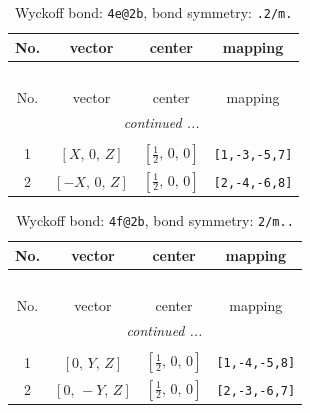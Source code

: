 \documentclass[fleqn,8pt]{jsarticle}
\begin{document}
\renewcommand{\arraystretch}{1.2}
\begin{longtable}{cccc}
\caption{Wyckoff bond: {\tt 4e@2b}, bond symmetry: {\tt .2/m.}}
 \\
 \hline \hline
No. & vector & center & mapping \\ \hline \endfirsthead

\multicolumn{3}{l}{\tablename\ \thetable{}} \\
 \hline \hline
No. & vector & center & mapping \\ \hline \endhead

 \hline \hline
\multicolumn{3}{r}{\footnotesize\it continued ...} \\ \endfoot

 \hline \hline
\multicolumn{3}{r}{} \\ \endlastfoot

1 & $\left[ X,\, 0,\, Z \right]$ & $\left[ \frac{1}{2},\, 0,\, 0 \right]$ & {\tt [1,-3,-5,7]} \\ \hline
2 & $\left[ - X,\, 0,\, Z \right]$ & $\left[ \frac{1}{2},\, 0,\, 0 \right]$ & {\tt [2,-4,-6,8]} \\
\end{longtable}
\renewcommand{\arraystretch}{1.2}
\begin{longtable}{cccc}
\caption{Wyckoff bond: {\tt 4f@2b}, bond symmetry: {\tt 2/m..}}
 \\
 \hline \hline
No. & vector & center & mapping \\ \hline \endfirsthead

\multicolumn{3}{l}{\tablename\ \thetable{}} \\
 \hline \hline
No. & vector & center & mapping \\ \hline \endhead

 \hline \hline
\multicolumn{3}{r}{\footnotesize\it continued ...} \\ \endfoot

 \hline \hline
\multicolumn{3}{r}{} \\ \endlastfoot

1 & $\left[ 0,\, Y,\, Z \right]$ & $\left[ \frac{1}{2},\, 0,\, 0 \right]$ & {\tt [1,-4,-5,8]} \\ \hline
2 & $\left[ 0,\, - Y,\, Z \right]$ & $\left[ \frac{1}{2},\, 0,\, 0 \right]$ & {\tt [2,-3,-6,7]} \\
\end{longtable}
\renewcommand{\arraystretch}{1.2}
\end{document}
